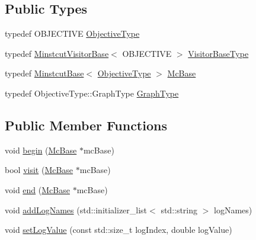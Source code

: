 \subsection*{Public Types}
\begin{DoxyCompactItemize}
\item 
typedef O\+B\+J\+E\+C\+T\+I\+VE \hyperlink{classnifty_1_1graph_1_1opt_1_1minstcut_1_1PyMinstcutVisitorBase_ae5e6bbf1ab459caf331a335a06e60a88}{Objective\+Type}
\item 
typedef \hyperlink{namespacenifty_1_1graph_1_1opt_1_1minstcut_a42d7fa14edf7c8f367a49541f392e5aa}{Minstcut\+Visitor\+Base}$<$ O\+B\+J\+E\+C\+T\+I\+VE $>$ \hyperlink{classnifty_1_1graph_1_1opt_1_1minstcut_1_1PyMinstcutVisitorBase_acb291bd40b0ab9974047df906651d5eb}{Visitor\+Base\+Type}
\item 
typedef \hyperlink{classnifty_1_1graph_1_1opt_1_1minstcut_1_1MinstcutBase}{Minstcut\+Base}$<$ \hyperlink{classnifty_1_1graph_1_1opt_1_1minstcut_1_1PyMinstcutVisitorBase_ae5e6bbf1ab459caf331a335a06e60a88}{Objective\+Type} $>$ \hyperlink{classnifty_1_1graph_1_1opt_1_1minstcut_1_1PyMinstcutVisitorBase_a77d46bc1780dd5d3aafdb832f529859b}{Mc\+Base}
\item 
typedef Objective\+Type\+::\+Graph\+Type \hyperlink{classnifty_1_1graph_1_1opt_1_1minstcut_1_1PyMinstcutVisitorBase_a7eca98be6e05ef40752b485bf1126312}{Graph\+Type}
\end{DoxyCompactItemize}
\subsection*{Public Member Functions}
\begin{DoxyCompactItemize}
\item 
void \hyperlink{classnifty_1_1graph_1_1opt_1_1minstcut_1_1PyMinstcutVisitorBase_a3b7f15ad2b7ac4842f7ddeedb97bf68e}{begin} (\hyperlink{classnifty_1_1graph_1_1opt_1_1minstcut_1_1PyMinstcutVisitorBase_a77d46bc1780dd5d3aafdb832f529859b}{Mc\+Base} $\ast$mc\+Base)
\item 
bool \hyperlink{classnifty_1_1graph_1_1opt_1_1minstcut_1_1PyMinstcutVisitorBase_ad457515b2b1c62906645c7687be6bc8d}{visit} (\hyperlink{classnifty_1_1graph_1_1opt_1_1minstcut_1_1PyMinstcutVisitorBase_a77d46bc1780dd5d3aafdb832f529859b}{Mc\+Base} $\ast$mc\+Base)
\item 
void \hyperlink{classnifty_1_1graph_1_1opt_1_1minstcut_1_1PyMinstcutVisitorBase_a9f2e4132c451512727e621287cacc760}{end} (\hyperlink{classnifty_1_1graph_1_1opt_1_1minstcut_1_1PyMinstcutVisitorBase_a77d46bc1780dd5d3aafdb832f529859b}{Mc\+Base} $\ast$mc\+Base)
\item 
void \hyperlink{classnifty_1_1graph_1_1opt_1_1minstcut_1_1PyMinstcutVisitorBase_a561220ee0991f93b6069a455fa84f130}{add\+Log\+Names} (std\+::initializer\+\_\+list$<$ std\+::string $>$ log\+Names)
\item 
void \hyperlink{classnifty_1_1graph_1_1opt_1_1minstcut_1_1PyMinstcutVisitorBase_a32ac765a4f9124c178450d5d5c865b49}{set\+Log\+Value} (const std\+::size\+\_\+t log\+Index, double log\+Value)
\end{DoxyCompactItemize}


